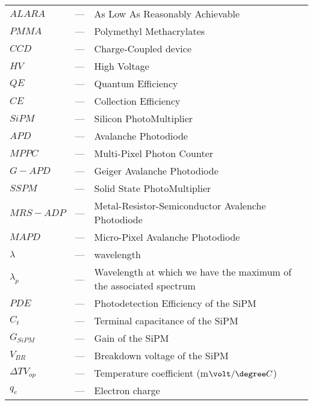 \begin{longtable}{p{25mm} c p{120mm} }
$ALARA$ & --- & As Low As Reasonably Achievable\\
$PMMA$ & --- & Polymethyl Methacrylates\\
$CCD$ & --- & Charge-Coupled device\\
$HV$ & --- & High Voltage\\
$QE$ & --- & Quantum Efficiency\\
$CE$ & --- & Collection Efficiency\\
$SiPM$ & --- & Silicon PhotoMultiplier\\
$APD$ & --- & Avalanche Photodiode\\
$MPPC$ & --- & Multi-Pixel Photon Counter\\
$G-APD$ & --- & Geiger Avalanche Photodiode\\
$SSPM$ & --- & Solid State PhotoMultiplier\\
$MRS-ADP$ & --- & Metal-Resistor-Semiconductor Avalenche Photodiode\\
$MAPD$ & --- & Micro-Pixel Avalanche Photodiode\\
$\lambda$ & --- & wavelength\\
$\lambda_p$ & --- & Wavelength at which we have the maximum of the
\newline associated spectrum\\
$PDE$ & --- & Photodetection Efficiency of the SiPM\\
$C_t$ & --- & Terminal capacitance of the SiPM\\
$G_{SiPM}$ & --- & Gain of the SiPM\\
$V_{BR}$ & --- & Breakdown voltage of the SiPM\\
$\Delta TV_{op}$ & --- & Temperature coefficient (m$\volt/\degree C$)\\
$q_{e}$ & --- & Electron charge\\



\end{longtable}
